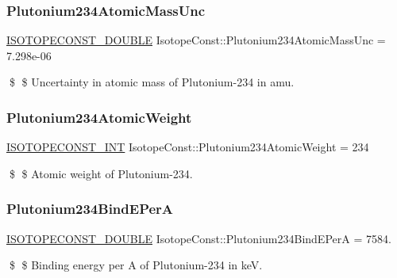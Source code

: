 \subsubsection{\texorpdfstring{Plutonium234\+Atomic\+Mass\+Unc}{Plutonium234AtomicMassUnc}}
{\footnotesize\ttfamily \mbox{\hyperlink{group___isotope_const-_macros_ga8f45a7272ce02c0b4c65c44636ed719a}{I\+S\+O\+T\+O\+P\+E\+C\+O\+N\+S\+T\+\_\+\+D\+O\+U\+B\+LE}} Isotope\+Const\+::\+Plutonium234\+Atomic\+Mass\+Unc = 7.\+298e-\/06}

\$ \$ Uncertainty in atomic mass of Plutonium-\/234 in amu. \mbox{\label{group___isotope_const-_plutonium-_pu234_ga6876aa007cfc7ad61122c049ca100d08}} 
\subsubsection{\texorpdfstring{Plutonium234\+Atomic\+Weight}{Plutonium234AtomicWeight}}
{\footnotesize\ttfamily \mbox{\hyperlink{group___isotope_const-_macros_ga5f18360b3e99483a35c32d789e62621c}{I\+S\+O\+T\+O\+P\+E\+C\+O\+N\+S\+T\+\_\+\+I\+NT}} Isotope\+Const\+::\+Plutonium234\+Atomic\+Weight = 234}

\$ \$ Atomic weight of Plutonium-\/234. \mbox{\label{group___isotope_const-_plutonium-_pu234_gadd4b3dfb0027caa81389e44b242eeca8}} 
\subsubsection{\texorpdfstring{Plutonium234\+Bind\+E\+PerA}{Plutonium234BindEPerA}}
{\footnotesize\ttfamily \mbox{\hyperlink{group___isotope_const-_macros_ga8f45a7272ce02c0b4c65c44636ed719a}{I\+S\+O\+T\+O\+P\+E\+C\+O\+N\+S\+T\+\_\+\+D\+O\+U\+B\+LE}} Isotope\+Const\+::\+Plutonium234\+Bind\+E\+PerA = 7584.}

\$ \$ Binding energy per A of Plutonium-\/234 in keV. \mbox{\label{group___isotope_const-_plutonium-_pu234_ga27399e69ae8b291cfeb642db067c14f4}} 
